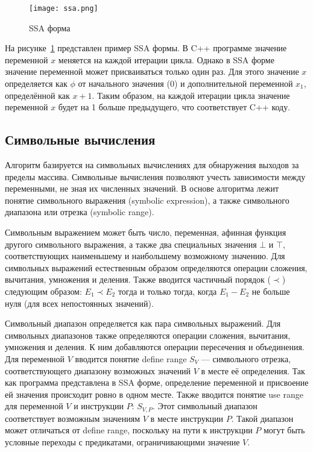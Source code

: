 \begin{figure}
    \texttt{[image: ssa.png]}
    \caption{SSA форма}
    \label{fig:ssa}
\end{figure}

На рисунке~\ref{fig:ssa} представлен пример SSA формы. В C++ программе
значение переменной $x$ меняется на каждой итерации цикла. Однако в
SSA форме значение переменной может присваиваться только один раз. Для
этого значение $x$ определяется как $\phi$ от начального значения
($0$) и дополнительной переменной $x_1$, определённой как $x +
1$. Таким образом, на каждой итерации цикла значение переменной $x$
будет на 1 больше предыдущего, что соответствует C++ коду.

\subsection{Символьные вычисления}

Алгоритм базируется на символьных вычислениях для обнаружения выходов
за пределы массива. Символьные вычисления позволяют учесть зависимости
между переменными, не зная их численных значений. В основе алгоритма
лежит понятие символьного выражения (symbolic expression), а также
символьного диапазона или отрезка (symbolic range).

Символьным выражением может быть число, переменная, афинная функция
другого символьного выражения, а также два специальных значения $\bot$
и $\top$, соответствующих наименьшему и наибольшему возможному
значению. Для символьных выражений естественным образом определяются
операции сложения, вычитания, умножения и деления. Также вводится
частичный порядок ($\prec$) следующим образом: $E_1 \prec E_2$ тогда и
только тогда, когда $E_1 - E_2$ не больше нуля (для всех непостоянных
значений).

Символьный диапазон определяется как пара символьных выражений. Для
символьных диапазонов также определяются операции сложения, вычитания,
умножения и деления. К ним добавляются операции пересечения и
объединения. Для переменной $V$ вводится понятие define range $S_V$
--- символьного отрезка, соответствующего диапазону возможных значений
$V$ в месте её определения. Так как программа представлена в SSA
форме, определение переменной и присвоение ей значения происходит
ровно в одном месте. Также вводится понятие use range для переменной
$V$ и инструкции $P$: $S_{V,P}$. Этот символьный диапазон
соответствует возможным значениям $V$ в месте инструкции $P$. Такой
диапазон может отличаться от define range, поскольку на пути к
инструкции $P$ могут быть условные переходы с предикатами,
ограничивающими значение $V$.

